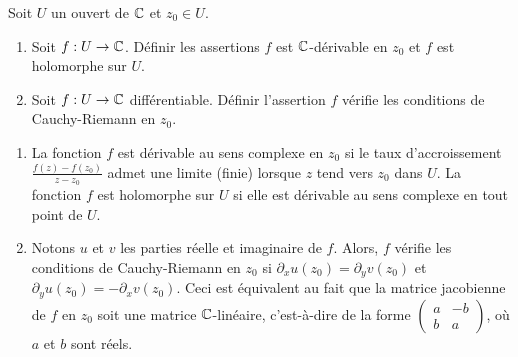 \begin{exo}
Soit $U$ un ouvert de $\mathbb{C}$ et $z_0\in U$.
\begin{enumerate}
\item Soit $f : U\to \mathbb{C}$. Définir les assertions \og $f$ est $\mathbb{C}$-dérivable en $z_0$ \fg{} et \og $f$ est holomorphe sur $U$.\fg
\item Soit $f : U\to \mathbb{C}$ différentiable.  Définir l'assertion \og $f$ vérifie les conditions de Cauchy-Riemann en $z_0$.\fg{}
\end{enumerate}
\begin{sol}
\begin{enumerate}
\item La fonction $f$ est dérivable au sens complexe en $z_0$ si le taux d'accroissement $\frac{f(z)-f(z_0)}{z-z_0}$ admet une limite (finie) lorsque $z$ tend vers $z_0$ dans $U$. 
La fonction $f$ est holomorphe sur $U$ si elle est dérivable au sens complexe en tout point de $U$.
\item Notons $u$ et $v$ les parties réelle et imaginaire de $f$.  Alors, $f$ vérifie les conditions de Cauchy-Riemann en $z_0$ si $\partial_x u (z_0) = \partial_y v (z_0)$ et $\partial_y u (z_0) = -\partial_x v(z_0)$. Ceci est équivalent au fait que la matrice jacobienne de $f$ en $z_0$ soit une matrice $\mathbb{C}$-linéaire, c'est-à-dire de la forme $\begin{pmatrix}
a& -b \\ b & a
\end{pmatrix}$, où $a$ et $b$ sont réels.
\end{enumerate}
\end{sol}

\end{exo}

